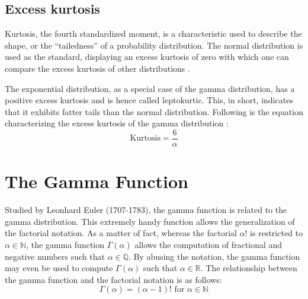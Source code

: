 \documentclass[12pt]{article}
\begin{document}
\subsection{Excess kurtosis}
Kurtosis, the fourth standardized moment, is a characteristic used to describe the shape, or the “tailedness” of a
probability distribution. The normal distribution is used as the standard, displaying an excess kurtosis of zero with
which one can compare the excess kurtosis of other distributions\cite{wikipediaKurtosis2022} .

The exponential distribution, as a special case of the gamma distribution, has a positive excess kurtosis and is hence
called leptokurtic. This, in short, indicates that it exhibits fatter tails than the normal distribution. Following is
the equation characterizing the excess kurtosis of the gamma distribution\cite{wikipediaKurtosis2022} :
\begin{equation}
	\text{Kurtosis} = \frac{6}{\alpha}
\end{equation}

\pagebreak
\section{The Gamma Function}
\vspace*{-6pt}
Studied by Leonhard Euler (1707-1783), the gamma function is related to the gamma distribution. This extremely handy
function allows the generalization of the factorial notation. As a matter of fact, whereas the factorial $\alpha!$ is
restricted to $\alpha\in\mathbb{N}$, the gamma function $\Gamma(\alpha)$ allows the computation of fractional and
negative numbers such that $\alpha\in\mathbb{Q}$. By abusing the notation, the gamma function may even be used to
compute $\Gamma(\alpha)$ such that $\alpha\in\mathbb{R}$. The relationship between the gamma function and the factorial
notation is as follows:
\vspace*{-18pt}
\begin{equation}\label{eq:gammafunction:factorial}
	\Gamma(\alpha)=(\alpha-1)!\text{ for }\alpha\in\mathbb{N}
\end{equation}
\vspace*{-60pt}
\end{document}
